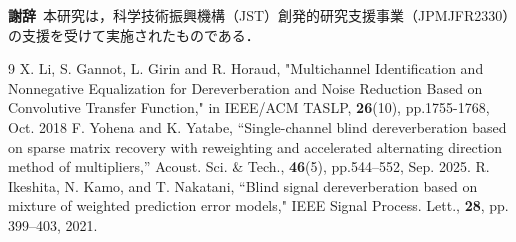 \documentclass[10pt,twocolumn,dvipdfmx]{jarticle} %
\begin{document}
\vspace{10pt}
\noindent \textbf{謝辞}~本研究は，科学技術振興機構（JST）創発的研究支援事業（JPMJFR2330）の支援を受けて実施されたものである．

\footnotesize{
\begin{thebibliography}{9}
   X. Li, S. Gannot, L. Girin and R. Horaud, "Multichannel Identification and Nonnegative Equalization for Dereverberation and Noise Reduction Based on Convolutive Transfer Function," in IEEE/ACM TASLP, \textbf{26}(10), pp.1755-1768, Oct. 2018
  F. Yohena and K. Yatabe, “Single-channel blind dereverberation based on sparse matrix recovery with reweighting and accelerated alternating direction method of multipliers,” Acoust. Sci. \& Tech., \textbf{46}(5), pp.544–552, Sep. 2025.
  R. Ikeshita, N. Kamo, and T. Nakatani, “Blind signal
dereverberation based on mixture of weighted prediction
error models," IEEE Signal Process. Lett., \textbf{28}, pp. 399–403, 2021.
\end{thebibliography}
}
\end{document}
